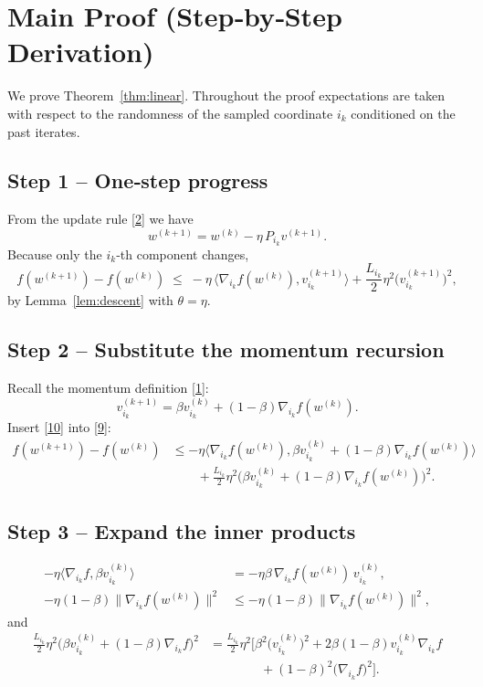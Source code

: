 \documentclass{article}
\begin{document}
\section*{Main Proof (Step‑by‑Step Derivation)}
We prove Theorem~\ref{thm:linear}.  Throughout the proof expectations are taken
with respect to the randomness of the sampled coordinate $i_k$ conditioned on
the past iterates.

\subsection*{Step 1 – One‑step progress}
From the update rule \eqref{2} we have
\[
    w^{(k+1)} = w^{(k)} - \eta\, P_{i_k} v^{(k+1)} .
\tag{8}
\]
Because only the $i_k$‑th component changes,
\[
    f(w^{(k+1)}) - f(w^{(k)}) 
    \;\le\; -\eta\,\big\langle \nabla_{i_k}f(w^{(k)}), v_{i_k}^{(k+1)}\big\rangle
          +\frac{L_{i_k}}{2}\eta^{2}\bigl(v_{i_k}^{(k+1)}\bigr)^{2},
\tag{9}
\]
by Lemma~\ref{lem:descent} with $\theta=\eta$.

\subsection*{Step 2 – Substitute the momentum recursion}
Recall the momentum definition \eqref{1}:
\[
    v_{i_k}^{(k+1)} = \beta v_{i_k}^{(k)} + (1-\beta) \nabla_{i_k} f(w^{(k)}).
\tag{10}
\]
Insert \eqref{10} into \eqref{9}:
\[
\begin{aligned}
    f(w^{(k+1)})-f(w^{(k)})
    &\le -\eta\Big\langle \nabla_{i_k}f(w^{(k)}),
                 \beta v_{i_k}^{(k)}+(1-\beta)\nabla_{i_k}f(w^{(k)})\Big\rangle \\
    &\qquad +\frac{L_{i_k}}{2}\eta^{2}
        \bigl(\beta v_{i_k}^{(k)}+(1-\beta)\nabla_{i_k}f(w^{(k)})\bigr)^{2}.
\end{aligned}
\tag{11}
\]

\subsection*{Step 3 – Expand the inner products}
\begin{align}
    -\eta\langle \nabla_{i_k}f, \beta v_{i_k}^{(k)}\rangle
        &=-\eta\beta\,\nabla_{i_k}f(w^{(k)})\,v_{i_k}^{(k)}, \tag{12}\\
    -\eta(1-\beta)\|\nabla_{i_k}f(w^{(k)})\|^{2}
        &\le -\eta(1-\beta)\|\nabla_{i_k}f(w^{(k)})\|^{2}, \tag{13}
\end{align}
and
\[
\begin{aligned}
    \frac{L_{i_k}}{2}\eta^{2}
        \bigl(\beta v_{i_k}^{(k)}+(1-\beta)\nabla_{i_k}f\bigr)^{2}
    &=\frac{L_{i_k}}{2}\eta^{2}\Big[
        \beta^{2}\bigl(v_{i_k}^{(k)}\bigr)^{2}
        +2\beta(1-\beta)v_{i_k}^{(k)}\nabla_{i_k}f \\
    &\qquad\qquad +(1-\beta)^{2}\bigl(\nabla_{i_k}f\bigr)^{2}
      \Big].
\end{aligned}
\tag{14}
\]
\end{document}
